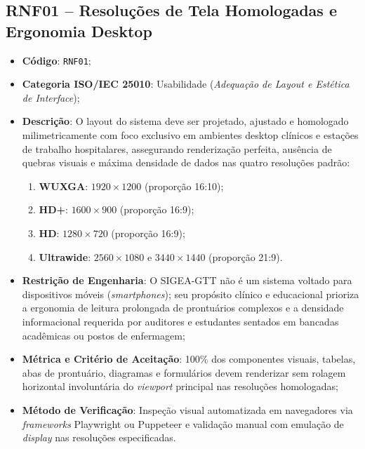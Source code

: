 \subsection{RNF01 -- Resoluções de Tela Homologadas e Ergonomia Desktop}
\begin{itemize}
    \item \textbf{Código}: \texttt{RNF01};
    \item \textbf{Categoria ISO/IEC 25010}: Usabilidade (\textit{Adequação de Layout e Estética de Interface});
    \item \textbf{Descrição}: O layout do sistema deve ser projetado, ajustado e homologado milimetricamente com foco exclusivo em ambientes desktop clínicos e estações de trabalho hospitalares, assegurando renderização perfeita, ausência de quebras visuais e máxima densidade de dados nas quatro resoluções padrão:
    \begin{enumerate}
        \item \textbf{WUXGA}: $1920 \times 1200$ (proporção 16:10);
        \item \textbf{HD+}: $1600 \times 900$ (proporção 16:9);
        \item \textbf{HD}: $1280 \times 720$ (proporção 16:9);
        \item \textbf{Ultrawide}: $2560 \times 1080$ e $3440 \times 1440$ (proporção 21:9).
    \end{enumerate}
    \item \textbf{Restrição de Engenharia}: O SIGEA-GTT não é um sistema voltado para dispositivos móveis (\textit{smartphones}); seu propósito clínico e educacional prioriza a ergonomia de leitura prolongada de prontuários complexos e a densidade informacional requerida por auditores e estudantes sentados em bancadas acadêmicas ou postos de enfermagem;
    \item \textbf{Métrica e Critério de Aceitação}: 100\% dos componentes visuais, tabelas, abas de prontuário, diagramas e formulários devem renderizar sem rolagem horizontal involuntária do \textit{viewport} principal nas resoluções homologadas;
    \item \textbf{Método de Verificação}: Inspeção visual automatizada em navegadores via \textit{frameworks} Playwright ou Puppeteer e validação manual com emulação de \textit{display} nas resoluções especificadas.
\end{itemize}

